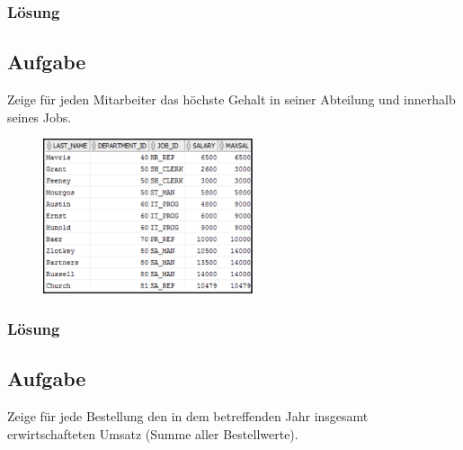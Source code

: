 \subsubsection*{Lösung}
\label{subsubsec:uebung_12.aufgabe_05.loesung}


\subsection{Aufgabe}
\label{subsec:uebung_12.aufgabe_06}
Zeige für jeden Mitarbeiter das höchste Gehalt in seiner Abteilung und innerhalb seines Jobs.

\begin{figure}[H]
  \centering
  \includegraphics[width=0.55\textwidth]{img//uebung_12_-_aufgabe_06.png}
  \label{img:uebung_12_-_aufgabe_06}
\end{figure}

\subsubsection*{Lösung}
\label{subsubsec:uebung_12.aufgabe_06.loesung}


\subsection{Aufgabe}
\label{subsec:uebung_12.aufgabe_07}
Zeige für jede Bestellung den in dem betreffenden Jahr insgesamt erwirtschafteten Umsatz (Summe aller Bestellwerte).

